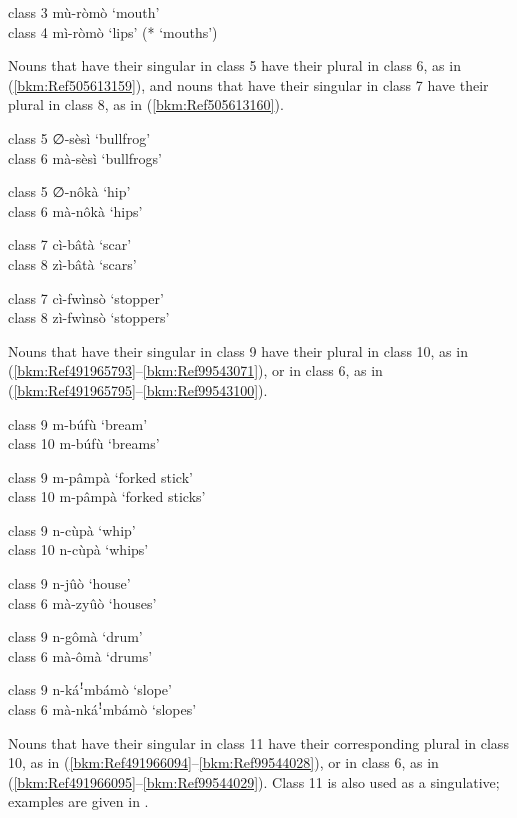 \ea
\label{bkm:Ref99542534}
class 3    mù-ròmò    ‘mouth’\\
class 4    mì-ròmò    ‘lips’ (* ‘mouths’)
\z

Nouns that have their singular in class 5 have their plural in class 6, as in (\ref{bkm:Ref505613159}), and nouns that have their singular in class 7 have their plural in class 8, as in (\ref{bkm:Ref505613160}).

\ea
\label{bkm:Ref505613159}
\ea
class 5    ∅-sèsì       ‘bullfrog’\\
class 6    mà-sèsì    ‘bullfrogs’

\ex
class 5    ∅-nôkà    ‘hip’\\
class 6    mà-nôkà    ‘hips’
\z\z

\ea
\label{bkm:Ref505613160}
\ea
class 7    cì-bâtà    ‘scar’\\
class 8    zì-bâtà    ‘scars’

\ex
class 7    cì-fwìnsò    ‘stopper’\\
class 8    zì-fwìnsò    ‘stoppers’
\z\z

Nouns that have their singular in class 9 have their plural in class 10, as in (\ref{bkm:Ref491965793}--\ref{bkm:Ref99543071}), or in class 6, as in (\ref{bkm:Ref491965795}--\ref{bkm:Ref99543100}).

\ea
\label{bkm:Ref491965793}
class 9    m-búfù    ‘bream’\\
class 10  m-búfù    ‘breams’
\z

\ea
class 9    m-pâmpà    ‘forked stick’\\
class 10  m-pâmpà    ‘forked sticks’
\z

\ea
\label{bkm:Ref99543071}
class 9    n-cùpà    ‘whip’\\
class 10  n-cùpà    ‘whips’
\z

\ea
\label{bkm:Ref491965795}
class 9    n-jûò      ‘house’\\
class 6    mà-zyûò    ‘houses’
\z

\ea
class 9    n-gômà    ‘drum’\\
class 6    mà-ômà    ‘drums’
\z

\ea
\label{bkm:Ref99543100}
class 9    n-káꜝmbámò    ‘slope’\\
class 6    mà-nkáꜝmbámò  ‘slopes’
\z

Nouns that have their singular in class 11 have their corresponding plural in class 10, as in (\ref{bkm:Ref491966094}--\ref{bkm:Ref99544028}), or in class 6, as in (\ref{bkm:Ref491966095}--\ref{bkm:Ref99544029}). Class 11 is also used as a singulative; examples are given in .

